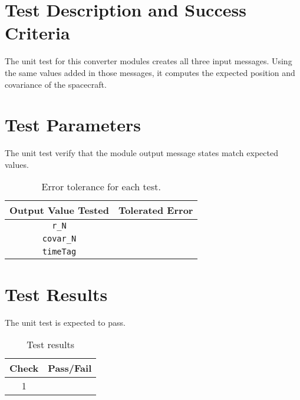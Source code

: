 
\section{Test Description and Success Criteria}

The unit test for this converter modules creates all three input messages. Using the same values added in those messages, it computes the expected position and covariance of the spacecraft.


\section{Test Parameters}

The unit test verify that the module output message states match expected values.
\begin{table}[htbp]
	\caption{Error tolerance for each test.}
	\label{tab:errortol}
	\centering \fontsize{10}{10}\selectfont
	\begin{tabular}{ c | c } %
		\hline\hline
		\textbf{Output Value Tested}  & \textbf{Tolerated Error}  \\ 
		\hline
		{\tt r\_N}        & 	   \\ 
		{\tt covar\_N}        & 	   \\ 
		{\tt timeTag}        & 	   \\ 
		\hline\hline
	\end{tabular}
\end{table}

\section{Test Results}
The unit test is expected to pass.
\begin{table}[H]
	\caption{Test results}
	\label{tab:results}
	\centering \fontsize{10}{10}\selectfont
	\begin{tabular}{c | c  } %
		\hline\hline
		\textbf{Check} &\textbf{Pass/Fail} \\ 
		\hline
	   1	   			&  \\ 
	   \hline\hline
	\end{tabular}
\end{table}


